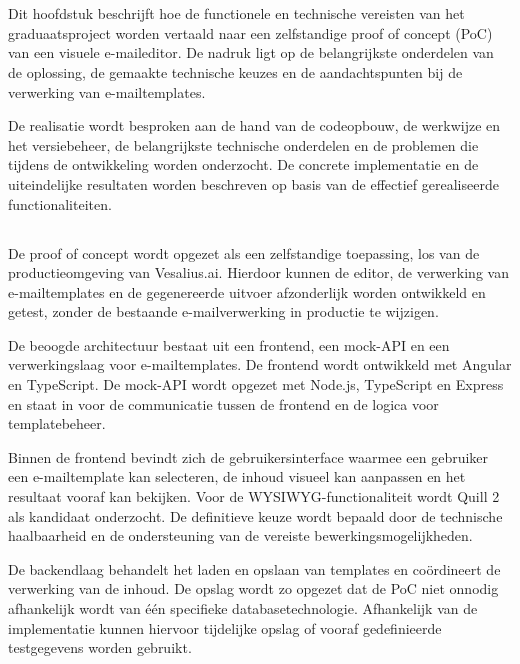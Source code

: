 \chapter{}%
\label{ch:realisatie}
Dit hoofdstuk beschrijft hoe de functionele en technische vereisten van het
graduaatsproject worden vertaald naar een zelfstandige proof of concept (PoC)
van een visuele e-maileditor. De nadruk ligt op de belangrijkste onderdelen
van de oplossing, de gemaakte technische keuzes en de aandachtspunten bij de
verwerking van e-mailtemplates.

De realisatie wordt besproken aan de hand van de codeopbouw, de werkwijze en
het versiebeheer, de belangrijkste technische onderdelen en de problemen die
tijdens de ontwikkeling worden onderzocht. De concrete implementatie en de
uiteindelijke resultaten worden beschreven op basis van de effectief
gerealiseerde functionaliteiten.

\section{}%
\label{sec:opbouw-code}
De proof of concept wordt opgezet als een zelfstandige toepassing, los van de
productieomgeving van Vesalius.ai. Hierdoor kunnen de editor, de verwerking
van e-mailtemplates en de gegenereerde uitvoer afzonderlijk worden ontwikkeld
en getest, zonder de bestaande e-mailverwerking in productie te wijzigen.

De beoogde architectuur bestaat uit een frontend, een mock-API en een
verwerkingslaag voor e-mailtemplates. De frontend wordt ontwikkeld met
Angular en TypeScript. De mock-API wordt opgezet met Node.js, TypeScript en
Express en staat in voor de communicatie tussen de frontend en de logica voor
templatebeheer.

Binnen de frontend bevindt zich de gebruikersinterface waarmee een gebruiker
een e-mailtemplate kan selecteren, de inhoud visueel kan aanpassen en het
resultaat vooraf kan bekijken. Voor de WYSIWYG-functionaliteit wordt Quill 2
als kandidaat onderzocht. De definitieve keuze wordt bepaald door de
technische haalbaarheid en de ondersteuning van de vereiste
bewerkingsmogelijkheden.

De backendlaag behandelt het laden en opslaan van templates en coördineert
de verwerking van de inhoud. De opslag wordt zo opgezet dat de PoC niet
onnodig afhankelijk wordt van één specifieke databasetechnologie. Afhankelijk
van de implementatie kunnen hiervoor tijdelijke opslag of vooraf gedefinieerde
testgegevens worden gebruikt.

